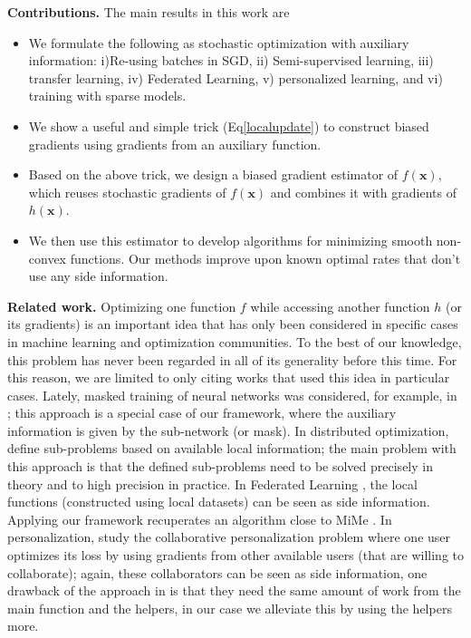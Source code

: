 \documentclass[10pt]{article} %
\theoremstyle{plain}
\theoremstyle{definition}
\theoremstyle{remark}
\def\vx{{\bm{x}}}
\begin{document}
\textbf{Contributions.} The main results in this work are
\begin{itemize}[nosep]
    \item We formulate the following as stochastic optimization with auxiliary information: i)Re-using batches in SGD, ii) Semi-supervised learning, iii) transfer learning, iv) Federated Learning, v) personalized learning, and vi) training with sparse models.
    \item We show a useful and simple trick (Eq\ref{localupdate}) to construct biased gradients using gradients from an auxiliary function.
    \item Based on the above trick, we design a biased gradient estimator of $f(\vx)$, which reuses stochastic gradients of $f(\vx)$ and combines it with gradients of $h(\vx)$.
    \item We then use this estimator to develop algorithms for minimizing smooth non-convex functions. Our methods improve upon known optimal rates that don't use any side information.
  \end{itemize}
\textbf{Related work.} Optimizing one function $f$ while accessing another function $h$ (or its gradients) is an important idea that has only been considered in specific cases in machine learning and optimization communities. To the best of our knowledge, this problem has never been regarded in all of its generality before this time. For this reason, we are limited to only citing works that used this idea in particular cases. Lately, masked training of neural networks was considered, for example, in \citep{ACDC, MaskedTraining}; this approach is a special case of our framework, where the auxiliary information is given by the sub-network (or mask). In distributed optimization, \citep{DANE} define sub-problems based on available local information; the main problem with this approach is that the defined sub-problems need to be solved precisely in theory and to high precision in practice. In Federated Learning \citep{FL, MacMahan2017, Mohri2019}, the local functions (constructed using local datasets) can be seen as side information. Applying our framework recuperates an algorithm close to MiMe \citep{MiMe}. In personalization, \citet{LinSpeedup} study the collaborative personalization problem where one user optimizes its loss by using gradients from other available users (that are willing to collaborate); again, these collaborators can be seen as side information, one drawback of the approach in \citep{LinSpeedup} is that they need the same amount of work from the main function and the helpers, in our case we alleviate this by using the helpers more.\\
\end{document}
